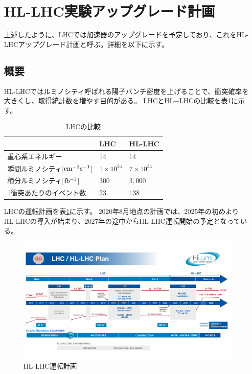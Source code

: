 \clearpage
\section{HL-LHC実験アップグレード計画}
上述したように、LHCでは加速器のアップグレードを予定しており、これをHL-LHCアップグレード計画と呼ぶ。詳細を以下に示す。
\subsection{概要}
HL-LHCではルミノシティ呼ばれる陽子バンチ密度を上げることで、衝突確率を大きくし、取得統計数を増やす目的がある。
LHCとHL$-$LHCの比較を表\ref{compare_lhc}に示す。

\begin{table}[tbp]
\begin{center}
\caption[LHCの比較]{LHCの比較\cite{1-6}}
\label{compare_lhc}
  \begin{tabular}{|lll|} \hline
    & LHC & HL-LHC \\ \hline
    重心系エネルギー & 14 & 14 \\
    瞬間ルミノシティ[$\rm{cm^{-2}s^{-1}}$] & $1\times 10^{34}$ & $7\times10^{34}$ \\
    積分ルミノシティ[$\rm{fb^{-1}}$] & $300$ & $3,000$ \\
    1衝突あたりのイベント数 & $23$ & $138$ \\ \hline 
  \end{tabular}
\end{center}
\end{table}

LHCの運転計画を表\ref{hllhc_plan}に示す。
2020年8月地点の計画では、2025年の初めよりHL-LHCの導入が始まり、2027年の途中からHL-LHC運転開始の予定となっている。
\begin{figure}[bpt]\centering
\includegraphics[width=12cm]{hllhc_plan}
\caption[HL-LHC運転計画]{HL-LHC運転計画\cite{1-7}}
\label{hllhc_plan}
\end{figure}

